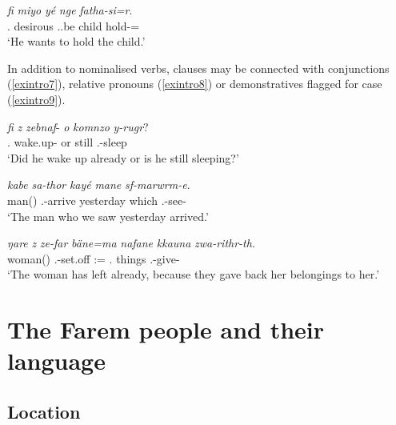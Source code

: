 \begin{exe}
	\ex
	\gll \emph{fi} \emph{miyo} \emph{yé} \emph{nge} \emph{fatha-si=r}.\\
	\Third.\Abs{} desirous \Tsg.\Masc.be child hold-\Nmlz=\Purp{}\\
	\trans `He wants to hold the child.'
	\label{exintro6}
\end{exe}

In addition to nominalised verbs, clauses may be connected with conjunctions (\ref{exintro7}), relative pronouns (\ref{exintro8}) or demonstratives flagged for case (\ref{exintro9}).%

\begin{exe}
	\ex
	\gll \emph{fi} \emph{z} \emph{zebnaf}-\Zero{} \emph{o} \emph{komnzo} \emph{y-rugr}?\\
	\Third.\Abs{} \Iam{} wake.up-\Tsg{} or still \Tsg.\Masc-sleep\\
	\trans `Did he wake up already or is he still sleeping?'
	\label{exintro7}
\end{exe}

\begin{exe}
	\ex
	\gll \emph{kabe} \emph{sa-thor} \emph{kayé} \emph{mane} \emph{sf-marwrm-e}.\\
	man(\Abs) \Tsg.\Masc-arrive yesterday which \Tsg.\Masc-see-\Fpl\\
	\trans `The man who we saw yesterday arrived.'
	\label{exintro8}
\end{exe}

\begin{exe}
	\ex
	\gll \emph{ŋare} \emph{z} \emph{ze-far} \emph{bäne=ma} \emph{nafane} \emph{kkauna} \emph{zwa-rithr-th}.\\
	woman(\Abs) \Iam{} \Tsg.\F-set.off \Dem:\Med=\Char{} \Tsg.\Poss{} things \Tsg.\F-give-\Tpl\\
	\trans `The woman has left already, because they gave back her belongings to her.'
	\label{exintro9}
\end{exe}

\section{The Farem people and their language}\label{faremlang}

\subsection{Location}\label{location}

